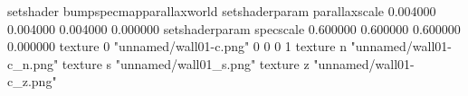 setshader bumpspecmapparallaxworld
setshaderparam parallaxscale 0.004000 0.004000 0.004000 0.000000
setshaderparam specscale 0.600000 0.600000 0.600000 0.000000
texture 0 "unnamed/wall01-c.png" 0 0 0 1
texture n "unnamed/wall01-c_n.png"
texture s "unnamed/wall01_s.png"
texture z "unnamed/wall01-c_z.png"